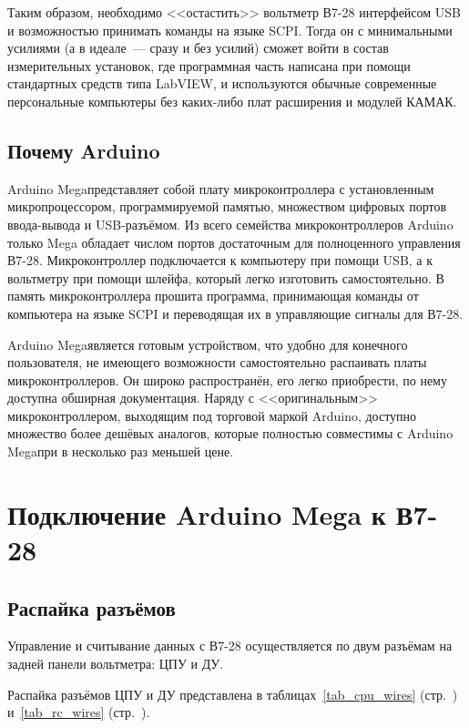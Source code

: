\documentclass[10pt, a4paper, twocolumn]{article}
\newcommand{\SCPI}{\mbox{SCPI}}
\newcommand{\V}{\mbox{В7-28}}
\newcommand{\Arduino}{Arduino Mega}
\begin{document}
Таким образом, необходимо <<остастить>> вольтметр \V{} интерфейсом USB и возможностью принимать команды на языке \SCPI. Тогда он с минимальными усилиями (а в идеале~--- сразу и без усилий) сможет войти в состав измерительных установок, где программная часть написана при помощи стандартных средств типа LabVIEW, и используются обычные современные персональные компьютеры без каких-либо плат расширения и модулей КАМАК.

\subsection{Почему Arduino}

\Arduino представляет собой плату микроконтроллера с установленным микропроцессором, программируемой памятью, множеством цифровых портов ввода-вывода и USB-разъёмом. Из всего семейства микроконтроллеров Arduino только Mega обладает числом портов достаточным для полноценного управления \V. Микроконтроллер подключается к компьютеру при помощи USB, а к вольтметру при помощи шлейфа, который легко изготовить самостоятельно.  В память микроконтроллера прошита программа, принимающая команды от компьютера на языке \SCPI{} и переводящая их в управляющие сигналы для \V.

\Arduino является готовым устройством, что удобно для конечного пользователя, не имеющего возможности самостоятельно распаивать платы микроконтроллеров. Он широко распространён, его легко приобрести, по нему доступна обширная документация. Наряду с <<оригинальным>> микроконтроллером, выходящим под торговой маркой Arduino, доступно множество более дешёвых аналогов, которые полностью совместимы с \Arduino при в несколько раз меньшей цене.

\section{Подключение {\Arduino} к \V}

\subsection{Распайка разъёмов}

Управление и считывание данных с {\V} осуществляется по двум разъёмам на задней панели вольтметра: ЦПУ и ДУ.

Распайка разъёмов ЦПУ и ДУ представлена в таблицах~\ref{tab_cpu_wires} (стр.~\pageref{tab_cpu_wires}) и~\ref{tab_rc_wires} (стр.~\pageref{tab_rc_wires}).
\end{document}
